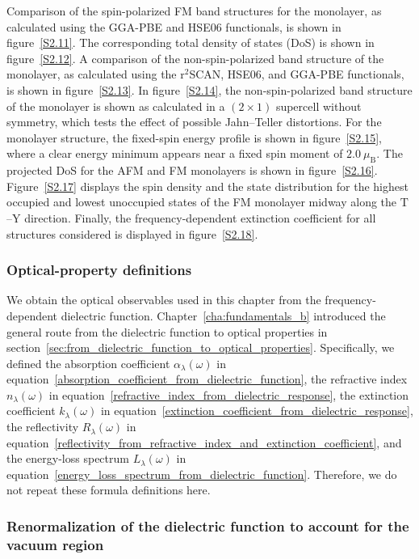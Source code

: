 Comparison of the spin-polarized FM band structures for the monolayer,
as calculated using the GGA-PBE and HSE06 functionals, is shown in figure~\ref{S2.11}.
The corresponding total density of states (DoS) is shown in figure~\ref{S2.12}.
A comparison of the non-spin-polarized band structure of the monolayer,
as calculated using the r$^{2}$SCAN, HSE06, and GGA-PBE functionals, is shown in figure~\ref{S2.13}.
In figure~\ref{S2.14}, the non-spin-polarized band structure of the monolayer is shown as calculated in a $(2\times1)$ supercell without symmetry,
which tests the effect of possible Jahn--Teller distortions.
For the monolayer structure, the fixed-spin energy profile is shown in figure~\ref{S2.15}, where a clear energy minimum appears near a fixed spin moment of $2.0~\mu_{\mathrm{B}}$.
The projected DoS for the AFM and FM monolayers is shown in figure~\ref{S2.16}.
Figure~\ref{S2.17} displays the spin density and the state distribution for the highest occupied and lowest unoccupied states of the FM monolayer midway along the $\mathrm{T}$--$\mathrm{Y}$ direction.
Finally, the frequency-dependent extinction coefficient for all structures considered is displayed in figure~\ref{S2.18}.

\subsubsection*{Optical-property definitions}

We obtain the optical observables used in this chapter from the frequency-dependent dielectric function.
Chapter~\ref{cha:fundamentals_b} introduced the general route from the dielectric function to optical properties in section~\ref{sec:from_dielectric_function_to_optical_properties}.
Specifically,
we defined the absorption coefficient $\alpha_{\lambda}(\omega)$ in equation~\eqref{absorption_coefficient_from_dielectric_function},
the refractive index $n_{\lambda}(\omega)$ in equation~\eqref{refractive_index_from_dielectric_response},
the extinction coefficient $k_{\lambda}(\omega)$ in equation~\eqref{extinction_coefficient_from_dielectric_response},
the reflectivity $R_{\lambda}(\omega)$ in equation~\eqref{reflectivity_from_refractive_index_and_extinction_coefficient},
and the energy-loss spectrum $L_{\lambda}(\omega)$ in equation~\eqref{energy_loss_spectrum_from_dielectric_function}.
Therefore, we do not repeat these formula definitions here.

\subsubsection*{Renormalization of the dielectric function to account for the vacuum region}

